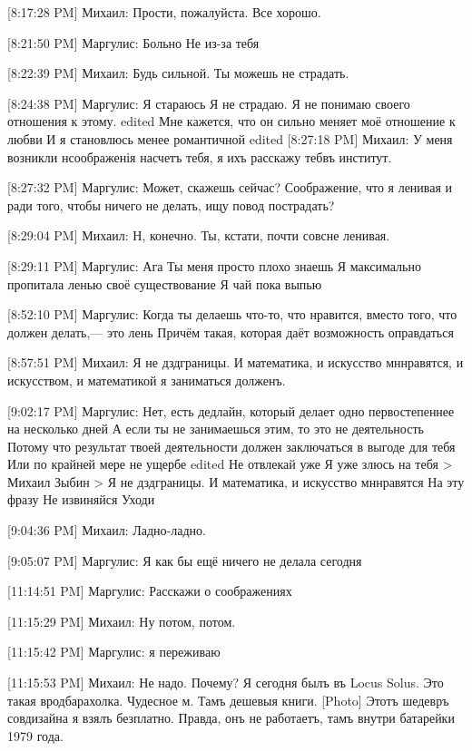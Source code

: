 \documentclass{article}
\newcommand{\yat}{{\fontencoding{X2}\selectfont\cyryat}} %
\begin{document}
[8:17:28 PM] Михаил:
Прости, пожалуйста. Все хорошо.

[8:21:50 PM] Маргулис:
Больно
 Не из-за тебя

[8:22:39 PM] Михаил:
Будь сильной. Ты можешь не страдать.

[8:24:38 PM] Маргулис:
Я стараюсь
 Я не страдаю.
 Я не понимаю своего отношения к этому.
edited 
Мне кажется, что он сильно меняет моё отношение к любви
 И я становлюсь менее романтичной
edited 
[8:27:18 PM] Михаил:
У меня возникли н соображенія насчетъ тебя, я ихъ расскажу теб\yat въ институт\yat.

[8:27:32 PM] Маргулис:
Может, скажешь сейчас?
 Соображение, что я ленивая и ради того, чтобы ничего не делать, ищу повод пострадать?

[8:29:04 PM] Михаил:
Н, конечно. Ты, кстати, почти совс не ленивая.

[8:29:11 PM] Маргулис:
Ага
 Ты меня просто плохо знаешь
 Я максимально пропитала ленью своё существование
 Я чай пока выпью

[8:52:10 PM] Маргулис:
Когда ты делаешь что-то, что нравится, вместо того, что должен делать,—  это лень
 Причём такая, которая даёт возможность оправдаться

[8:57:51 PM] Михаил:
Я не д зд границы. И математика, и искусство мн\yat нравятся, и искусством, и математикой я заниматься долженъ.

[9:02:17 PM] Маргулис:
Нет, есть дедлайн, который делает одно первостепеннее на несколько дней
 А если ты не занимаешься этим, то это не деятельность
 Потому что результат твоей деятельности должен заключаться в выгоде для тебя
 Или по крайней мере не ущербе
edited 
Не отвлекай уже
 Я уже злюсь на тебя
> Михаил Зыбин
> Я не д зд границы. И математика, и искусство мн\yat нравятся
На эту фразу
 Не извиняйся
 Уходи

[9:04:36 PM] Михаил:
Ладно-ладно.

[9:05:07 PM] Маргулис:
Я как бы ещё ничего не делала сегодня

[11:14:51 PM] Маргулис:
Расскажи о соображениях

[11:15:29 PM] Михаил:
Ну потом, потом.

[11:15:42 PM] Маргулис:
я переживаю

[11:15:53 PM] Михаил:
Не надо. Почему?
 Я сегодня былъ въ Locus Solus. Это такая врод\yat барахолка.
 Чудесное м. Тамъ дешевыя книги.
 [Photo]
 Этотъ шедевръ сов дизайна я взялъ безплатно. Правда, онъ не работаетъ, тамъ внутри батарейки 1979 года.
\end{document}
